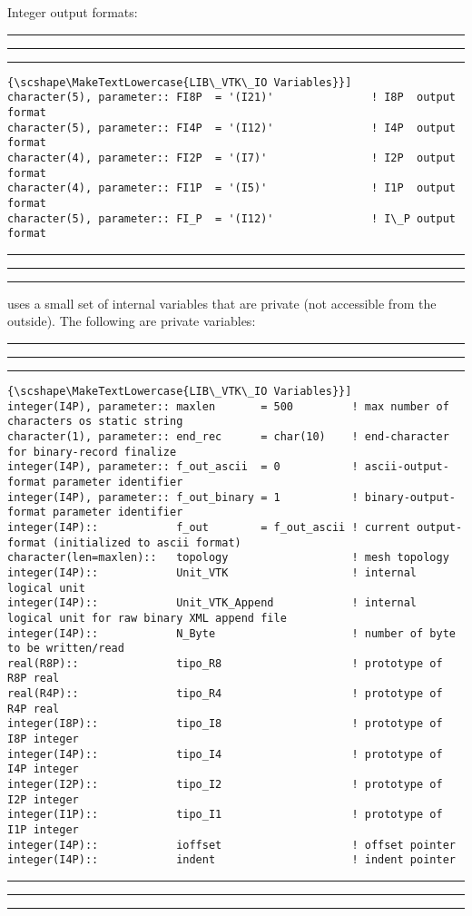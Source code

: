 \documentclass[pagesize=pdftex,fontsize=10pt,paper=a4,oneside]{scrbook}
\DeclareRobustCommand{\MarginNote}[1]{\marginpar{%
\slshape\footnotesize%
\parindent=0pt\lineskip=0pt\lineskiplimit=0pt%
\tolerance=2000\hyphenpenalty=300\exhyphenpenalty=300%
\doublehyphendemerits=100000\finalhyphendemerits=\doublehyphendemerits%
\raggedright\hspace{0pt}#1}}
\newenvironment{boxred}[1]%
               {%
                \noindent\hspace*{-0.025\textwidth}%
                \color{Maroon}%
                \rule[-5.8pt]{0.6pt}{6pt}\hspace*{-0.6pt}\rule{1.05\textwidth}{0.6pt}\hspace*{-0.6pt}\rule[-5.8pt]{0.6pt}{6pt}%
                \color{black}%
                \vspace*{0.6pt}\MarginNote{\color{Maroon}{#1}}%
               }%
               {%
                \noindent\hspace*{-0.025\textwidth}%
                \color{Maroon}%
                \rule[0pt]{0.6pt}{6pt}\hspace*{-0.6pt}\rule{1.05\textwidth}{0.6pt}\hspace*{-0.6pt}\rule[0pt]{0.6pt}{6pt}%
                \color{black}%
                \vspace*{2mm}%
               }
\DeclareRobustCommand{\MaiuscolettoBS}[1]{\textls[80]{\scshape\MakeTextLowercase{#1}}}
\begin{document}
 Integer output formats:

 
\begin{boxred}{}
\begin{lstlisting}[style=variables,title=\color{Maroon}\MaiuscolettoBS{LIB\_VTK\_IO Variables}]
character(5), parameter:: FI8P  = '(I21)'               ! I8P  output format
character(5), parameter:: FI4P  = '(I12)'               ! I4P  output format
character(4), parameter:: FI2P  = '(I7)'                ! I2P  output format
character(4), parameter:: FI1P  = '(I5)'                ! I1P  output format
character(5), parameter:: FI_P  = '(I12)'               ! I\_P output format
\end{lstlisting}

\end{boxred}
 

\LIBVTKIO uses a small set of internal variables that are private (not accessible from the outside). The following are
 private variables:

 
\begin{boxred}{}
\begin{lstlisting}[style=variables,title=\color{Maroon}\MaiuscolettoBS{LIB\_VTK\_IO Variables}]
integer(I4P), parameter:: maxlen       = 500         ! max number of characters os static string
character(1), parameter:: end_rec      = char(10)    ! end-character for binary-record finalize
integer(I4P), parameter:: f_out_ascii  = 0           ! ascii-output-format parameter identifier
integer(I4P), parameter:: f_out_binary = 1           ! binary-output-format parameter identifier
integer(I4P)::            f_out        = f_out_ascii ! current output-format (initialized to ascii format)
character(len=maxlen)::   topology                   ! mesh topology
integer(I4P)::            Unit_VTK                   ! internal logical unit
integer(I4P)::            Unit_VTK_Append            ! internal logical unit for raw binary XML append file
integer(I4P)::            N_Byte                     ! number of byte to be written/read
real(R8P)::               tipo_R8                    ! prototype of R8P real
real(R4P)::               tipo_R4                    ! prototype of R4P real
integer(I8P)::            tipo_I8                    ! prototype of I8P integer
integer(I4P)::            tipo_I4                    ! prototype of I4P integer
integer(I2P)::            tipo_I2                    ! prototype of I2P integer
integer(I1P)::            tipo_I1                    ! prototype of I1P integer
integer(I4P)::            ioffset                    ! offset pointer
integer(I4P)::            indent                     ! indent pointer

\end{lstlisting}

\end{boxred}
 
\end{document}
